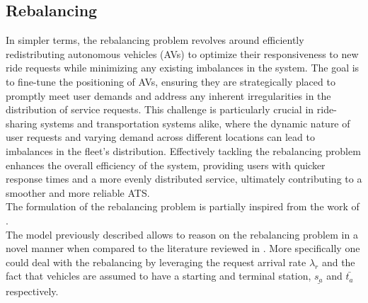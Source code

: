 \subsection{Rebalancing}\label{sec:rebal}
In simpler terms, the rebalancing problem revolves around efficiently redistributing autonomous vehicles (AVs) to optimize their responsiveness to new ride requests while minimizing any existing imbalances in the system. The goal is to fine-tune the positioning of AVs, ensuring they are strategically placed to promptly meet user demands and address any inherent irregularities in the distribution of service requests. This challenge is particularly crucial in ride-sharing systems and transportation systems alike, where the dynamic nature of user requests and varying demand across different locations can lead to imbalances in the fleet's distribution. Effectively tackling the rebalancing problem enhances the overall efficiency of the system, providing users with quicker response times and a more evenly distributed service, ultimately contributing to a smoother and more reliable ATS. \\
The formulation of the rebalancing problem is partially inspired from the work of . \\
The model previously described allows to reason on the rebalancing problem in a novel manner when compared to the literature reviewed in . More specifically one could deal with the rebalancing by leveraging the request arrival rate $\lambda_r$ and the fact that vehicles are assumed to have a starting and terminal station, $\underline{s_a}$ and $\bar{t_a}$ respectively. 


